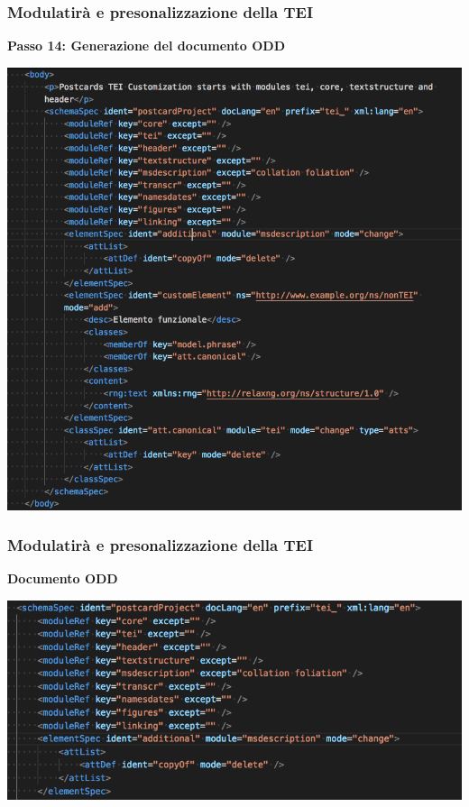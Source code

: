 \begin{frame}
    \frametitle{Modulatirà e presonalizzazione della TEI}
    \addtocounter{nframe}{1}
    
    \textbf{Passo 14: Generazione del documento ODD}

     \begin{center}
        \includegraphics[width=.65\textwidth]{imgs/CustomizationODD.png}
     \end{center}
    
\end{frame}


\begin{frame}
    \frametitle{Modulatirà e presonalizzazione della TEI}
    \addtocounter{nframe}{1}
    
    \textbf{Documento ODD}

     \begin{center}
        \includegraphics[width=.97\textwidth]{imgs/CustomizationODD-1.png}
     \end{center}
    
\end{frame}

